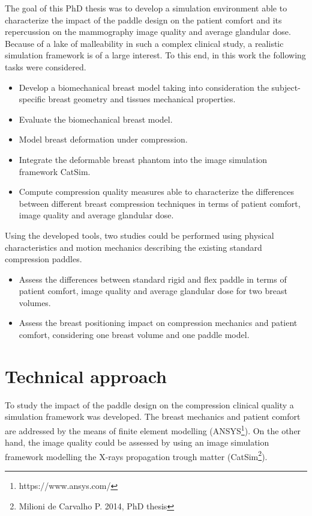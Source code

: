 The goal of this PhD thesis was to develop a simulation environment able to characterize the impact of the paddle design on the patient comfort and its repercussion on the mammography image quality and average glandular dose.  Because of a lake of malleability in such a complex clinical study, a realistic simulation framework is of a large interest. To this end, in this work the following tasks were considered.
\begin{itemize}
\item Develop a biomechanical breast model taking into consideration the subject-specific breast geometry and tissues mechanical properties. 

\item Evaluate the biomechanical breast model. 

\item Model breast deformation under compression.

\item Integrate the deformable breast phantom into the image simulation framework CatSim.
\item Compute compression quality measures able to characterize the differences between different breast compression techniques in terms of patient comfort, image quality and average glandular dose.  

\end{itemize}   

Using the developed tools, two studies could be performed using physical characteristics and motion mechanics describing the existing standard compression paddles.
\begin{itemize}
\item Assess the differences between standard rigid and flex paddle in terms of patient comfort, image quality and average glandular dose for two breast volumes.

\item Assess the breast positioning impact on compression mechanics and patient comfort, considering one breast volume and one paddle model.
\end{itemize}
 
\cleardoublepage
\chapter*{Technical approach}\label{section:technicalapproach}

To study the impact of the paddle design on the compression clinical quality a simulation framework was developed.  The breast mechanics and patient comfort are addressed by the means of finite element modelling (ANSYS\footnote{https://www.ansys.com/}). On the other hand, the image quality could be assessed by using an image simulation framework modelling the X-rays propagation trough matter (CatSim\footnote{Milioni de Carvalho P. 2014, PhD thesis}). 


